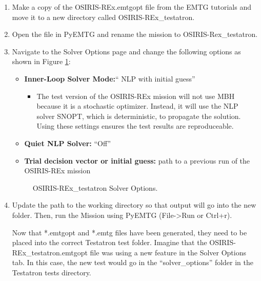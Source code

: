 \documentclass[11pt]{article}
\begin{document}
\begin{enumerate}
	\item Make a copy of the OSIRIS-REx.emtgopt file from the EMTG tutorials and move it to a new directory called OSIRIS-REx\_testatron. 
	\item Open the file in PyEMTG and rename the mission to OSIRIS-Rex\_testatron. 
	\item Navigate to the Solver Options page and change the following options as shown in Figure \ref{fig:solver_options}:
	\begin{itemize}
		\item\textbf{Inner-Loop Solver Mode:}`` \acs{NLP} with initial guess''
		\begin{itemize}		
			\item The test version of the OSIRIS-REx mission will not use \ac{MBH} because it is a stochastic optimizer. Instead, it will use the \ac{NLP} solver \acs{SNOPT}, which is deterministic, to propagate the solution. Using these settings ensures the test results are reproduceable. 
		\end{itemize}
		\item\textbf{Quiet NLP Solver:} ``Off''
		\item\textbf{Trial decision vector or initial guess:} path to a previous run of the OSIRIS-REx mission
	\end{itemize}

\begin{figure}[H]
	\centering
	\caption{\label{fig:solver_options}OSIRIS-REx\_testatron Solver Options.}
\end{figure}

	\item Update the path to the working directory so that output will go into the new folder. Then, run the Mission using PyEMTG (File-\textgreater Run or Ctrl+r).

Now that *.emtgopt and *.emtg files have been generated, they need to be placed into the correct Testatron test folder. Imagine that the OSIRIS-REx\_testatron.emtgopt file was using a new feature in the Solver Options tab. In this case, the new test would go in the ``solver\_options'' folder in the Testatron tests directory. 


\end{enumerate}
\end{document}

